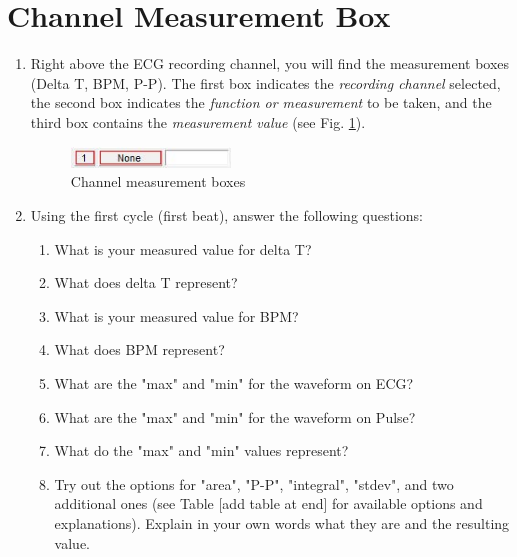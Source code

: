 \documentclass{article}
\begin{document}
\section*{Channel Measurement Box}
\begin{enumerate}
	\item Right above the ECG recording channel, you will find the measurement boxes (Delta T, BPM, P-P). The first box indicates the \textit{recording channel} selected, the second box indicates the \textit{function or measurement} to be taken, and the third box contains the \textit{measurement value} (see Fig. \ref{meas_box}).
	
		\begin{figure}[h]
		\includegraphics[width=0.4\textwidth]{../images/BIOPAC_16.jpg}
		\centering
		\caption{Channel measurement boxes}
		\label{meas_box}
		\end{figure}
		
	\item Using the first cycle (first beat), answer the following questions:
		\begin{enumerate}
			\item What is your measured value for delta T?
			\item What does delta T represent?
			\item What is your measured value for BPM?
			\item What does BPM represent?
			\item What are the "max" and "min" for the waveform on ECG?
			\item What are the "max" and "min" for the waveform on Pulse?
			\item What do the "max" and "min" values represent?
			\item Try out the options for "area", "P-P", "integral", "stdev", and two additional ones (see Table [add table at end] for available options and explanations). Explain in your own words what they are and the resulting value.
		\end{enumerate}
\end{enumerate}
\end{document}
